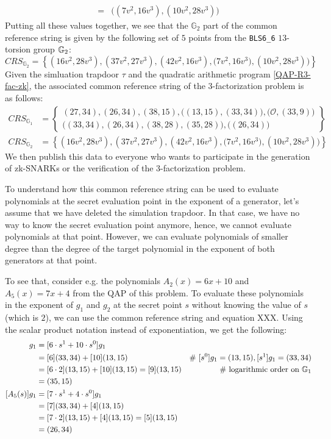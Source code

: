 \begin{example}
\begin{align*}
 = & \Big((7v^2,16v^3),(10v^2,28v^3)\Big)
\end{align*}
Putting all these values together, we see that the $\mathbb{G}_2$ part of the common reference string is given by the following set of $5$ points from the \texttt{BLS6\_6} $13$-torsion group $\mathbb{G}_2$:
$$
CRS_{\mathbb{G}_{2}}=\left\{(16v^2,28v^3) ,(37v^2,27v^3),(42v^2,16v^3),\Big(7v^2,16v^3), (10v^2,28v^3)\Big)\right\} 
$$
Given the simluation trapdoor $\tau$ and the quadratic arithmetic program \ref{QAP-R3-fac-zk}, the associated common reference string of the $3$-factorization problem is as follows:
\begin{align*}
CRS_{\mathbb{G}_{1}} &=\left\{ \begin{array}{c}
(27,34),(26,34),(38,15),\Big((13,15),(33,34)\Big),
\Big(\mathcal{O}, (33,9)\Big)\\
\Big((33,34),(26,34),(38,28),(35,28)\Big),
\Big((26,34)\Big)
\end{array}\right\}\\
CRS_{\mathbb{G}_{2}} &=\left\{(16v^2,28v^3) ,(37v^2,27v^3),(42v^2,16v^3),\Big(7v^2,16v^3), (10v^2,28v^3)\Big)\right\}
\end{align*}
We then publish this data to everyone who wants to participate in the generation of zk-SNARKs  or the verification of the $3$-factorization problem.

To understand how this common reference string can be used to evaluate polynomials at the secret evaluation point in the exponent of a generator, let's assume that we have deleted the simulation trapdoor. In that case, we have no way to know the secret evaluation point anymore, hence, we cannot evaluate polynomials at that point. However, we can evaluate polynomials of  smaller degree than the degree of the target polynomial in the exponent of both generators at that point. 

To see that, consider e.g. the polynomials $A_2(x)= 6x +10$ and $A_5(x)=7x+4$ from the QAP of this problem. To evaluate these polynomials in the exponent of $g_1$ and $g_2$ at the secret point $s$ without knowing the value of $s$ (which is $2$), we can use the common reference string and equation XXX. Using the scalar product notation instead of exponentiation, we get the following:
\begin{align*}
[A_2(s)]g_1 & = [6\cdot s^1 + 10\cdot s^0] g_1 \\
     & = [6](33,34) + [10](13,15) & \text{\# } [s^0]g_1 = (13,15), [s^1]g_1 = (33,34)\\
     & = [6\cdot 2](13,15) + [10](13,15) = [9](13,15) & \text{\# logarithmic order on } \G_1 \\   
     & = (35,15)\\
[A_5(s)]g_1 & = [7\cdot s^1 + 4\cdot s^0] g_1 \\
     & = [7](33,34) + [4](13,15) \\
     & = [7\cdot 2](13,15) + [4](13,15) = [5](13,15)\\
     & = (26,34)     
\end{align*}


\end{example}
